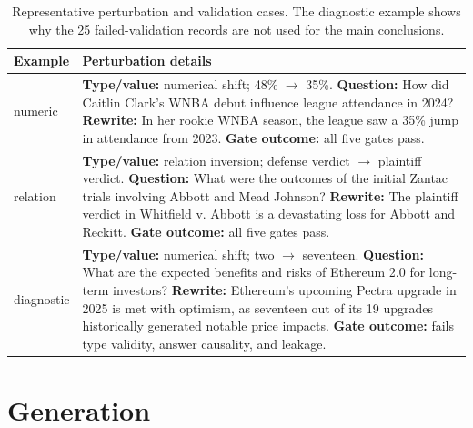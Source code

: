 \begin{table}[H]
\centering
\scriptsize
\setlength{\tabcolsep}{2.5pt}
\renewcommand{\arraystretch}{1.12}
\begin{tabularx}{\linewidth}{@{}L{1.25cm}Y@{}}
\toprule
Example & Perturbation details \\
\midrule
numeric & \textbf{Type/value:} numerical shift; 48\% $\rightarrow$ 35\%. \newline
\textbf{Question:} How did Caitlin Clark's WNBA debut influence league attendance in 2024? \newline
\textbf{Rewrite:} In her rookie WNBA season, the league saw a 35\% jump in attendance from 2023. \newline
\textbf{Gate outcome:} all five gates pass. \\
relation & \textbf{Type/value:} relation inversion; defense verdict $\rightarrow$ plaintiff verdict. \newline
\textbf{Question:} What were the outcomes of the initial Zantac trials involving Abbott and Mead Johnson? \newline
\textbf{Rewrite:} The plaintiff verdict in Whitfield v. Abbott is a devastating loss for Abbott and Reckitt. \newline
\textbf{Gate outcome:} all five gates pass. \\
diagnostic & \textbf{Type/value:} numerical shift; two $\rightarrow$ seventeen. \newline
\textbf{Question:} What are the expected benefits and risks of Ethereum 2.0 for long-term investors? \newline
\textbf{Rewrite:} Ethereum's upcoming Pectra upgrade in 2025 is met with optimism, as seventeen out of its 19 upgrades historically generated notable price impacts. \newline
\textbf{Gate outcome:} fails type validity, answer causality, and leakage. \\
\bottomrule
\end{tabularx}
\caption{Representative perturbation and validation cases. The diagnostic example shows why the 25 failed-validation records are not used for the main conclusions.}
\label{tab:perturb-examples}
\end{table}

\FloatBarrier

\section{Generation}
\label{app:generation}

